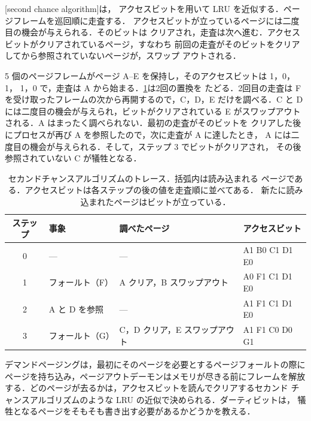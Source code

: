 \documentclass[../main.tex]{subfiles}
\begin{document}
\begin{definition}[セカンドチャンスアルゴリズム]
  [second chance algorithm]は，
  アクセスビットを用いて LRU を近似する．ページフレームを巡回順に走査する．
  アクセスビットが立っているページには二度目の機会が与えられる．そのビットは
  クリアされ，走査は次へ進む．アクセスビットがクリアされているページ，すなわち
  前回の走査がそのビットをクリアしてから参照されていないページが，スワップ
  アウトされる．
\end{definition}

\begin{example}
  \label{ex:l08-second-chance}
  5 個のページフレームがページ A--E を保持し，そのアクセスビットは 1，0，1，
  1，0 で，走査は A から始まる．\cref{tab:l08-second-chance}は2回の置換を
  たどる．2回目の走査は F を受け取ったフレームの次から再開するので，C，D，E
  だけを調べる．C と D には二度目の機会が与えられ，ビットがクリアされている E
  がスワップアウトされる．A はまったく調べられない．最初の走査がそのビットを
  クリアした後にプロセスが再び A を参照したので，次に走査が A に達したとき，
  A には二度目の機会が与えられる．そして，ステップ 3 でビットがクリアされ，
  その後参照されていない C が犠牲となる．
\end{example}

\begin{table}[htbp]
  \centering
  \caption{セカンドチャンスアルゴリズムのトレース．括弧内は読み込まれる
    ページである．アクセスビットは各ステップの後の値を走査順に並べてある．
    新たに読み込まれたページはビットが立っている．}
  \label{tab:l08-second-chance}
  \small
  \begin{tabular}{@{}clll@{}}
    \toprule
    ステップ & 事象 & 調べたページ & アクセスビット \\
    \midrule
    0 & ---            & ---                           & A1 B0 C1 D1 E0 \\
    1 & フォールト（F） & A クリア，B スワップアウト     & A0 F1 C1 D1 E0 \\
    2 & A と D を参照   & ---                           & A1 F1 C1 D1 E0 \\
    3 & フォールト（G） & C，D クリア，E スワップアウト  & A1 F1 C0 D0 G1 \\
    \bottomrule
  \end{tabular}
\end{table}

\begin{keypoint}
  デマンドページングは，最初にそのページを必要とするページフォールトの際に
  ページを持ち込み，ページアウトデーモンはメモリが尽きる前にフレームを解放
  する．どのページが去るかは，アクセスビットを読んでクリアするセカンド
  チャンスアルゴリズムのような LRU の近似で決められる．ダーティビットは，
  犠牲となるページをそもそも書き出す必要があるかどうかを教える．
\end{keypoint}
\end{document}
